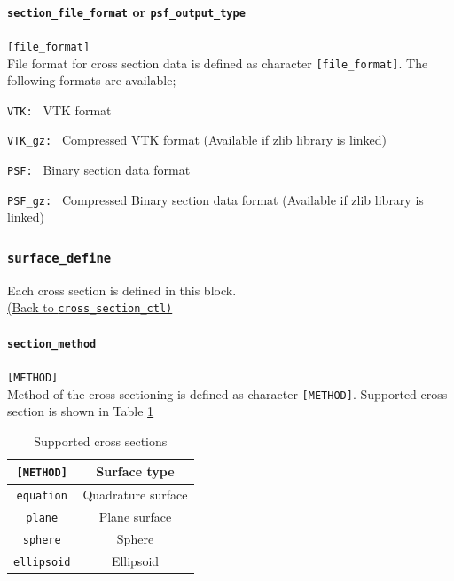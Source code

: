 \paragraph{{\tt section\_file\_format} or {\tt psf\_output\_type}}
\label{href_t:section_file_format}
\verb|[file_format]| \\
File format for cross section data is defined as character \verb|[file_format]|. The following formats are available;
\begin{description}
\item{\tt VTK:     } VTK format
\item{\tt VTK\_gz: } Compressed VTK format (Available if zlib library is linked)
\item{\tt PSF:     } Binary section data format
\item{\tt PSF\_gz: } Compressed Binary section data format (Available if zlib library is linked)
\end{description}

\subsubsection{\tt surface\_define}
\label{href_t:surface_define}
Each cross section is defined in this block. \\
\hyperref[href_i:cross_section_ctl]{(Back to {\tt cross\_section\_ctl)}} \\

\paragraph{\tt section\_method}
\label{href_t:section_method}
\verb|[METHOD]| \\
Method of the cross sectioning is defined as character \verb|[METHOD]|. Supported cross section is shown in Table \ref{table:surface_list}
%
\begin{table}[htp]
\caption{Supported cross sections}
\begin{center}
\begin{tabular}{|c|c|}
\hline
\verb|[METHOD]| & Surface type \\ \hline
\verb|equation| & Quadrature surface \\
\verb|plane| & Plane surface \\
\verb|sphere| & Sphere \\
\verb|ellipsoid| & Ellipsoid  \\
\hline
\end{tabular}
\end{center}
\label{table:surface_list}
\end{table}
%

